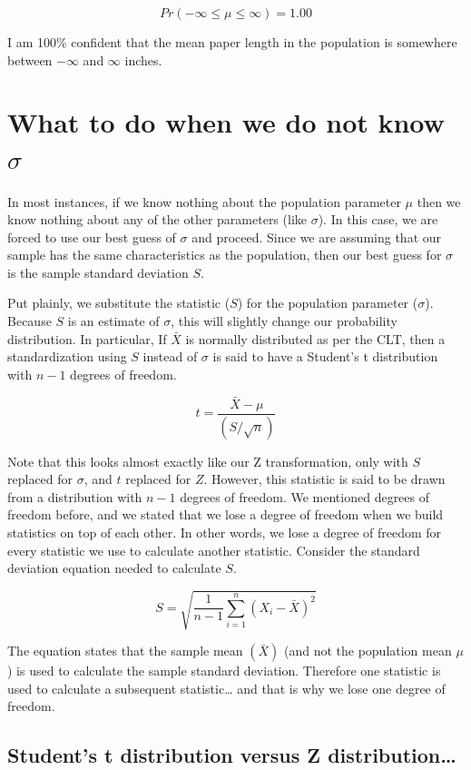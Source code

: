 \documentclass[
]{book}
\begin{document}
\[ Pr(-\infty \leq \mu \leq \infty) = 1.00 \]

I am 100\% confident that the mean paper length in the population is somewhere between \(-\infty\) and \(\infty\) inches.

\section{\texorpdfstring{What to do when we do not know \(\sigma\)}{What to do when we do not know \textbackslash sigma}}\label{what-to-do-when-we-do-not-know-sigma}

In most instances, if we know nothing about the population parameter \(\mu\) then we know nothing about any of the other parameters (like \(\sigma\)). In this case, we are forced to use our best guess of \(\sigma\) and proceed. Since we are assuming that our sample has the same characteristics as the population, then our best guess for \(\sigma\) is the sample standard deviation \(S\).

Put plainly, we substitute the statistic (\(S\)) for the population parameter (\(\sigma\)). Because \(S\) is an estimate of \(\sigma\), this will slightly change our probability distribution. In particular, If \(\bar{X}\) is normally distributed as per the CLT, then a standardization using \(S\) instead of \(\sigma\) is said to have a Student's t distribution with \(n-1\) degrees of freedom.

\[t=\frac{\bar{X}-\mu}{(S/\sqrt{n})}\]

Note that this looks almost exactly like our Z transformation, only with \(S\) replaced for \(\sigma\), and \(t\) replaced for \(Z\). However, this statistic is said to be drawn from a distribution with \(n-1\) degrees of freedom. We mentioned degrees of freedom before, and we stated that we lose a degree of freedom when we build statistics on top of each other. In other words, we lose a degree of freedom for every statistic we use to calculate another statistic. Consider the standard deviation equation needed to calculate \(S\).

\[S = \sqrt{\frac{1}{n-1} \sum_{i=1}^n(X_i-\bar{X})^2}\]

The equation states that the sample mean \((\bar{X})\) (and not the population mean \(\mu\)) is used to calculate the sample standard deviation. Therefore one statistic is used to calculate a subsequent statistic\ldots{} and that is why we lose one degree of freedom.

\subsection{Student's t distribution versus Z distribution\ldots{}}\label{students-t-distribution-versus-z-distribution}
\end{document}
